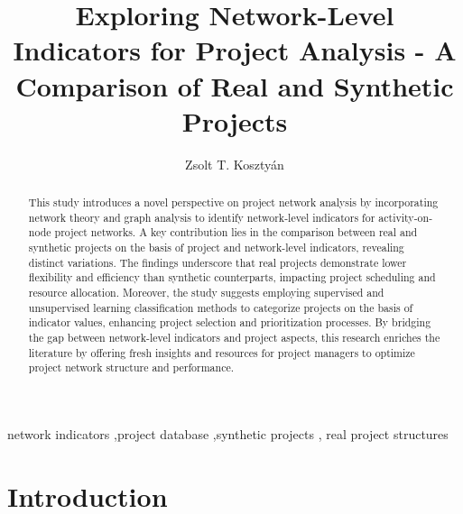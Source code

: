 \documentclass[preprint,
3p]{elsarticle} %
\begin{document}
\begin{frontmatter}

  \title{Exploring Network-Level Indicators for Project Analysis - A
Comparison of Real and Synthetic Projects}
    \author[University of Pannonia, Institute of Advanced Studies
Kőszeg]{Zsolt T. Kosztyán%
  }
  
  \begin{abstract}
  This study introduces a novel perspective on project network analysis
  by incorporating network theory and graph analysis to identify
  network-level indicators for activity-on-node project networks. A key
  contribution lies in the comparison between real and synthetic
  projects on the basis of project and network-level indicators,
  revealing distinct variations. The findings underscore that real
  projects demonstrate lower flexibility and efficiency than synthetic
  counterparts, impacting project scheduling and resource allocation.
  Moreover, the study suggests employing supervised and unsupervised
  learning classification methods to categorize projects on the basis of
  indicator values, enhancing project selection and prioritization
  processes. By bridging the gap between network-level indicators and
  project aspects, this research enriches the literature by offering
  fresh insights and resources for project managers to optimize project
  network structure and performance.
  \end{abstract}
    \begin{keyword}
    network indicators \sep project database \sep synthetic
projects \sep 
    real project structures
  \end{keyword}
  
 \end{frontmatter}

\sloppy

\section{Introduction}\label{sec:intro}
\end{document}
